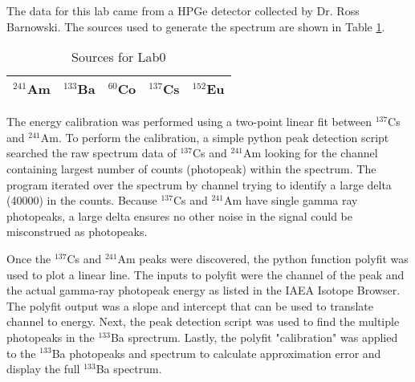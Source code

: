 The data for this lab came from a HPGe detector collected by Dr. Ross Barnowski. The sources used to generate the spectrum are shown in Table \ref{tab:sources}.

\begin{table}[H]
\centering
\caption{Sources for Lab0}
\label{tab:sources}
\begin{tabular}{@{}lllll@{}}
\toprule
$^{241}$Am & $^{133}$Ba & $^{60}$Co & $^{137}$Cs & $^{152}$Eu \\ \bottomrule
\end{tabular}
\end{table}

The energy calibration was performed using a two-point linear fit between $^{137}$Cs and $^{241}$Am. To perform the calibration, a simple python peak detection script searched the raw spectrum data of $^{137}$Cs and $^{241}$Am looking for the channel containing largest number of counts (photopeak) within the spectrum. The program iterated over the spectrum by channel trying to identify a large delta (40000) in the counts. Because $^{137}$Cs and $^{241}$Am have single gamma ray photopeaks, a large delta ensures no other noise in the signal could be misconstrued as photopeaks.

Once the $^{137}$Cs and $^{241}$Am peaks were discovered, the python function polyfit was used to plot a linear line. The inputs to polyfit were the channel of the peak and the actual gamma-ray photopeak energy as listed in the IAEA Isotope Browser. The polyfit output was a slope and intercept that can be used to translate channel to energy. Next, the peak detection script was used to find the multiple photopeaks in the $^{133}$Ba sprectrum. Lastly, the polyfit "calibration" was applied to the $^{133}$Ba photopeaks and spectrum to calculate approximation error and display the full $^{133}$Ba spectrum.

